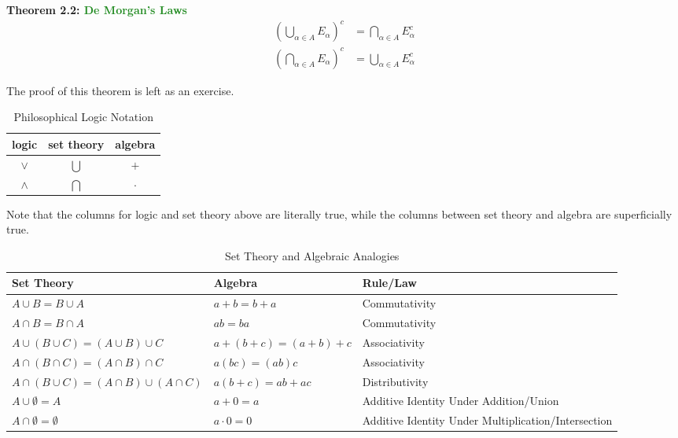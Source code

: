\documentclass{article}
\begin{document}
\textbf{Theorem 2.2: \textcolor{ForestGreen}{De Morgan's Laws}}
\begin{align*}
    \left(\bigcup_{\alpha \in A} E_{\alpha} \right)^c &= \bigcap_{\alpha \in A} E_{\alpha} ^c\\
    \left(\bigcap_{\alpha \in A} E_{\alpha} \right)^c &= \bigcup_{\alpha \in A} E_{\alpha} ^c
\end{align*}

The proof of this theorem is left as an exercise.

\begin{table}[H]
\centering
\begin{tabular}{|c|c|c|}
  \hline
  logic & set theory & algebra \\
  \hline
  $\lor$ & $\bigcup$ & $+$ \\
  \hline
  $\land$ & $\bigcap$ & $\cdot$ \\
  \hline
\end{tabular}
\caption{Philosophical Logic Notation}
\end{table}

Note that the columns for logic and set theory above are literally true, while the columns between set theory and algebra are superficially true.

\begin{table}[H]
\centering
\begin{tabular}{|p{5cm}|p{3.9cm}|p{4cm}|}
    \hline
    \textbf{Set Theory} & \textbf{Algebra} & \textbf{Rule/Law} \\
    \hline
    $A \cup B = B \cup A$ & $a + b = b + a$ & Commutativity \\
    \hline 
    $A \cap B = B \cap A$ & $ab = ba$ & Commutativity \\
    \hline 
    $A \cup (B \cup C) = (A \cup B) \cup C$ & $a + (b + c) = (a + b) + c$ & Associativity \\
    \hline
    $A \cap (B \cap C) = (A \cap B) \cap C$ & $a(bc) = (ab)c$ & Associativity \\
    \hline 
    $A \cap (B \cup C) = (A \cap B) \cup (A \cap C)$ & $a(b + c) = ab+ac$ & Distributivity \\
    \hline
    $A \cup \emptyset = A$ & $a+0=a$ & Additive Identity Under Addition/Union\\
    \hline
    $A \cap \emptyset = \emptyset$ & $a \cdot 0 = 0$ & Additive Identity Under Multiplication/Intersection\\
    \hline
\end{tabular}
\caption{Set Theory and Algebraic Analogies}
\end{table}
\end{document}
